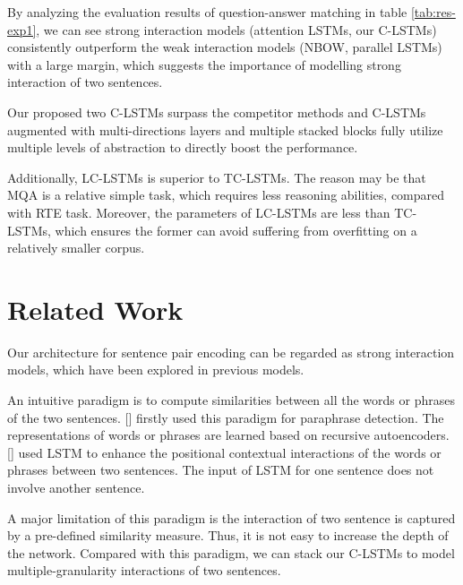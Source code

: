 \documentclass{article}
\newcommand\newcite[1]{\citeauthor{#1} [\citeyear{#1}]}
\begin{document}
By analyzing the evaluation results of question-answer matching in table \ref{tab:res-exp1}, we can see
strong interaction models (attention LSTMs, our C-LSTMs) consistently outperform the weak interaction models (NBOW, parallel LSTMs) with a large margin, which suggests the importance of modelling strong interaction of two sentences.


Our proposed two C-LSTMs surpass the competitor methods and C-LSTMs augmented with multi-directions layers and multiple stacked blocks fully utilize multiple levels of abstraction to directly boost the performance.

Additionally, LC-LSTMs is superior to TC-LSTMs. The reason may be that MQA is a relative simple task, which requires less reasoning abilities, compared with RTE task. Moreover, the parameters of LC-LSTMs are less than TC-LSTMs, which ensures the former can avoid suffering from overfitting on a relatively smaller corpus.




\section{Related Work}
Our architecture for sentence pair encoding can be regarded as strong interaction models, which have been explored in previous models.

An intuitive paradigm is to compute similarities between all the words or phrases of the two sentences. \newcite{socher2011dynamic} firstly used this paradigm for paraphrase detection. The representations of words or phrases are learned  based on recursive autoencoders. \newcite{wan2015deep} used LSTM to enhance the positional contextual interactions of the words or phrases between two sentences. The input of LSTM for one sentence does not involve another sentence.

A major limitation of this paradigm is the interaction of two sentence is captured by a pre-defined similarity measure. Thus, it is not easy to increase the depth of the network. Compared with this paradigm, we can stack our C-LSTMs to model multiple-granularity interactions of two sentences.

\end{document}
